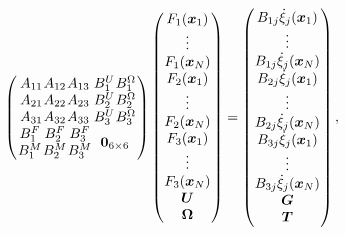 \begin{equation}
\label{eq:swimmingStructure}
\arraycolsep=0.4pt\def\arraystretch{1}
\left(
\begin{array}{cc}
\begin{array}{ccc}
A_{11} & A_{12} & A_{13} \\
A_{21} & A_{22} & A_{23} \\
A_{31} & A_{32} & A_{33}
\end{array} &
\begin{array}{cc}
B_{1}^{U} & B_{1}^{\Omega} \\
B_{2}^{U} & B_{2}^{\Omega} \\
B_{3}^{U} & B_{3}^{\Omega} \\
\end{array} \\
\begin{array}{ccc}
B_{1}^{F} & B_{2}^{F} & B_{3}^{F} \\
B_{1}^{M} & B_{2}^{M} & B_{3}^{M}
\end{array} & \bm{0}_{6 \times 6}
\end{array}
\right)
\left(\begin{array}{c}
F_{1}({\bm{x}}_{1}) \\
\vdots \\
F_{1}({\bm{x}}_{N}) \\
F_{2}({\bm{x}}_{1}) \\
\vdots \\
F_{2}({\bm{x}}_{N}) \\
F_{3}({\bm{x}}_{1}) \\
\vdots \\
F_{3}({\bm{x}}_{N}) \\
\boldsymbol{U} \\
\boldsymbol{\Omega}
\end{array}\right)=\left(\begin{array}{c}
B_{1 j} \dot{\xi}_{j}({\bm{x}}_{1}) \\
\vdots \\
B_{1 j} \dot{\xi}_{j}({\bm{x}}_{N}) \\
B_{2 j} \dot{\xi}_{j}({\bm{x}}_{1}) \\
\vdots \\
B_{2 j} \dot{\xi}_{j}({\bm{x}}_{N}) \\
B_{3 j} \dot{\xi}_{j}({\bm{x}}_{1}) \\
\vdots \\
B_{3 j}\dot{\xi}_{j}({\bm{x}}_{N}) \\
\bm{G} \\
\bm{T}
\end{array}\right),
\end{equation}
